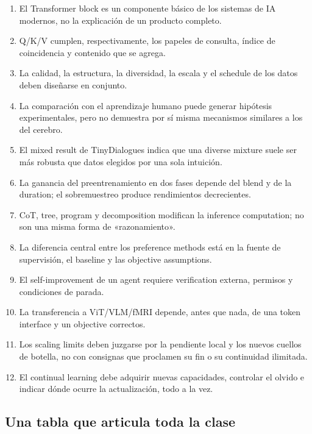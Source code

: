 \documentclass[a4paper]{article}
\begin{document}
\begin{enumerate}
  \item El Transformer block es un componente básico de los sistemas de IA modernos, no la explicación de un producto completo.
  \item Q/K/V cumplen, respectivamente, los papeles de consulta, índice de coincidencia y contenido que se agrega.
  \item La calidad, la estructura, la diversidad, la escala y el schedule de los datos deben diseñarse en conjunto.
  \item La comparación con el aprendizaje humano puede generar hipótesis experimentales, pero no demuestra por sí misma mecanismos similares a los del cerebro.
  \item El mixed result de TinyDialogues indica que una diverse mixture suele ser más robusta que datos elegidos por una sola intuición.
  \item La ganancia del preentrenamiento en dos fases depende del blend y de la duration; el sobremuestreo produce rendimientos decrecientes.
  \item CoT, tree, program y decomposition modifican la inference computation; no son una misma forma de «razonamiento».
  \item La diferencia central entre los preference methods está en la fuente de supervisión, el baseline y las objective assumptions.
  \item El self-improvement de un agent requiere verification externa, permisos y condiciones de parada.
  \item La transferencia a ViT/VLM/fMRI depende, antes que nada, de una token interface y un objective correctos.
  \item Los scaling limits deben juzgarse por la pendiente local y los nuevos cuellos de botella, no con consignas que proclamen su fin o su continuidad ilimitada.
  \item El continual learning debe adquirir nuevas capacidades, controlar el olvido e indicar dónde ocurre la actualización, todo a la vez.
\end{enumerate}

\subsection{Una tabla que articula toda la clase}
\end{document}
